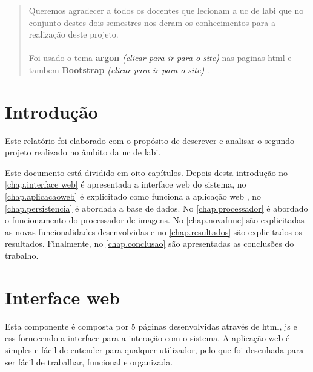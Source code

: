 \documentclass{report}
\begin{document}
\renewcommand{\abstractname}{Agradecimentos}
\begin{abstract}
Queremos agradecer a todos os docentes que lecionam a  \ac{uc} de \ac{labi} que no conjunto destes dois semestres nos deram os conhecimentos para a realização deste projeto.\\
\\
Foi usado o tema \textbf{argon} \href{https://demos.creative-tim.com/argon-design-system/index.html}{\textit{(clicar para ir para o site)}} nas paginas html e tambem \textbf{Bootstrap} \href{https://getbootstrap.com/}{\textit{(clicar para ir para o site)}} .

\end{abstract}


\tableofcontents
\listoffigures    


\clearpage
{}

\chapter{Introdução}
\label{chap.introducao}

Este relatório foi elaborado com o propósito de descrever e analisar o segundo projeto realizado no âmbito da \ac{uc} de \ac{labi}.

Este documento está dividido em oito capítulos.
Depois desta introdução no \autoref{chap.interface web} é apresentada a interface web do sistema, no \autoref{chap.aplicacaoweb} é explicitado como funciona a aplicação web , no \autoref{chap.persistencia} é abordada a base de dados. No \autoref{chap.processador} é abordado o funcionamento do processador de imagens. No \autoref{chap.novafunc} são explicitadas as novas funcionalidades desenvolvidas e no  \autoref{chap.resultados} são explicitados os resultados. Finalmente, no \autoref{chap.conclusao} são apresentadas
as conclusões do trabalho.

\chapter{Interface web}
\label{chap.interface web}
Esta componente é composta por 5 páginas desenvolvidas através de  \ac{html}, \ac{js} e \ac{css} fornecendo a interface para a interação com o sistema. A aplicação web é simples e fácil de entender para qualquer utilizador, pelo que foi desenhada para ser fácil de trabalhar, funcional e organizada.
\end{document}
